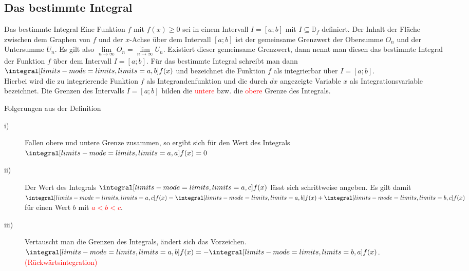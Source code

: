     \subsection{Das bestimmte Integral}
       \begin{defi}{Das bestimmte Integral}{}
        Eine Funktion $f$ mit $f(x)\geq 0$ sei in einem Intervall $I = [a; b]$ mit $I \subseteq \mathds{D}_f$ definiert. Der Inhalt der Fläche zwischen dem Graphen von $f$ und der $x$-Achse über dem Intervall $[a;b]$ ist der gemeinsame Grenzwert der Obersumme $O_n$ und der Untersumme $U_n$. Es gilt also $\lim\limits_{n \longrightarrow \infty} O_n = \lim\limits_{n \longrightarrow \infty} U_n $. Existiert dieser gemeinsame Grenzwert, dann nennt man diesen das bestimmte Integral der Funktion $f$ über dem Intervall $I = [a;b]$. Für das bestimmte Integral schreibt man dann $\integral[limits-mode=limits,limits={a, b}]{f(x)}$ und bezeichnet die Funktion $f$ als integrierbar über $I=[a;b]$. \\
        Hierbei wird die zu integrierende Funktion $f$ als Integrandenfunktion und die durch $dx$ angezeigte Variable $x$ als Integrationsvariable bezeichnet. Die Grenzen des Intervalls $I= [a;b]$ bilden die \textcolor{red}{untere} bzw. die \textcolor{red}{obere} Grenze des Integrals.
    \end{defi}
    \begin{b8d}{Folgerungen aus der Definition}{}
    \begin{description}
    \item[i)] Fallen obere und untere Grenze zusammen, so ergibt sich für den Wert des Integrals \textcolor{red}{$\integral[limits-mode=limits,limits={a, a}]{f(x)} = 0$}
    \item[ii)] Der Wert des Integrals $\integral[limits-mode=limits,limits={a, c}]{f(x)}$ lässt sich schrittweise angeben. Es gilt damit \\ \textcolor{red}{$\integral[limits-mode=limits,limits={a, c}]{f(x)} = \integral[limits-mode=limits,limits={a, b}]{f(x)} + \integral[limits-mode=limits,limits={b, c}] {f(x)}$ } für einen Wert $b$ mit \textcolor{red}{$a<b<c$}.
    \item[iii)] Vertauscht man die Grenzen des Integrals, ändert sich das Vorzeichen.\\ \textcolor{red}{ $\integral[limits-mode=limits,limits={a, b}] {f(x)} = - \integral[limits-mode=limits,limits={b, a}] {f(x)}$}. \textcolor{red}{(Rückwärtsintegration)}
    \end{description}
    \end{b8d}
